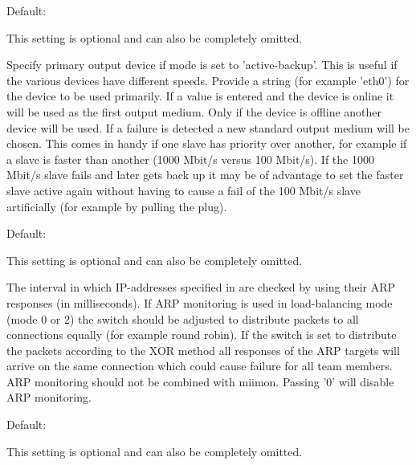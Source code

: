 \begin{description}
\begin{itemize}
  \end{itemize}
  

  Default: 

  This setting is optional and can also be completely omitted.

  Specify primary output device if mode is set to 'active-backup'.
  This is useful if the various devices have different speeds. 
  Provide a string (for example 'eth0') for the device to be used primarily.
  If a value is entered and the device is online it will be used
  as the first output medium. Only if the device is offline another 
  device will be used. If a failure is detected a new standard 
  output medium will be chosen. This comes in handy if one slave 
  has priority over another, for example if a slave is faster
  than another (1000 Mbit/s versus 100 Mbit/s).
  If the 1000 Mbit/s slave fails and later gets back up it may 
  be of advantage to set the faster slave active again without 
  having to cause a fail of the 100 Mbit/s slave artificially
  (for example by pulling the plug).
  

  Default: 

  This setting is optional and can also be completely omitted.

  The interval in which IP-addresses specified in 
   are checked by using 
  their ARP responses (in milliseconds). If ARP monitoring 
  is used in load-balancing mode (mode 0 or 2) the switch 
  should be adjusted to distribute packets to all connections 
  equally (for example round robin). If the switch is set to
  distribute the packets according to the XOR method all responses 
  of the ARP targets will arrive on the same connection which could
  cause failure for all team members. ARP monitoring should not 
  be combined with miimon. Passing '0' will disable ARP monitoring.
  

  Default: 

  This setting is optional and can also be completely omitted.


\end{description}
